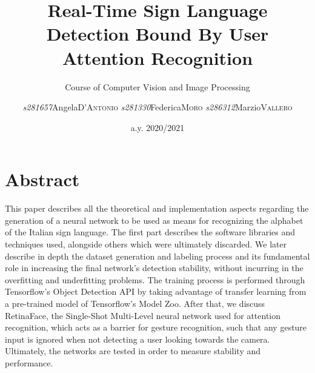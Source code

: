 \documentclass[a4paper, 12pt]{article}
\institute{Polytechnic of Turin}
\title{Real-Time Sign Language Detection Bound By User Attention Recognition }
\subtitle{Course of Computer Vision and Image Processing}
\author{\textit{s281657}\quad Angela\quad \textsc{D'Antonio}\linebreak
        \textit{s281330}\quad Federica\quad \textsc{Moro}\linebreak
        \textit{s286312}\quad Marzio\quad \textsc{Vallero}\linebreak}
\date{a.y. 2020/2021}
\begin{document}
\maketitle
\romantableofcontents
\sloppy
\twocolumn

\section{Abstract}
\label{Abstract}
This paper describes all the theoretical and implementation aspects regarding the generation of a neural network to be used as means for recognizing the alphabet of the Italian sign language.
The first part describes the software libraries and techniques used, alongside others which were ultimately discarded.
We later describe in depth the dataset generation and labeling process and its fundamental role in increasing the final network's detection stability, without incurring in the overfitting and underfitting problems.
The training process is performed through Tensorflow's Object Detection API by taking advantage of transfer learning from a pre-trained model of Tensorflow's Model Zoo.
After that, we discuss RetinaFace, the Single-Shot Multi-Level neural network used for attention recognition, which acts as a barrier for gesture recognition, such that any gesture input is ignored when not detecting a user looking towards the camera.
Ultimately, the networks are tested in order to measure stability and performance.
\end{document}
